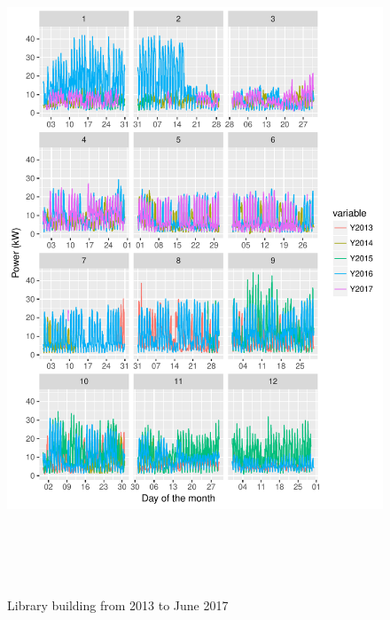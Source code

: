 \documentclass[11pt, oneside]{article}   	%
\begin{document}
\clearpage
\begin{figure}
\includegraphics[width=30cm,height=20cm,keepaspectratio]{library_build.pdf}
\caption{Library building from  2013 to June 2017}
\end{figure}
\end{document}
